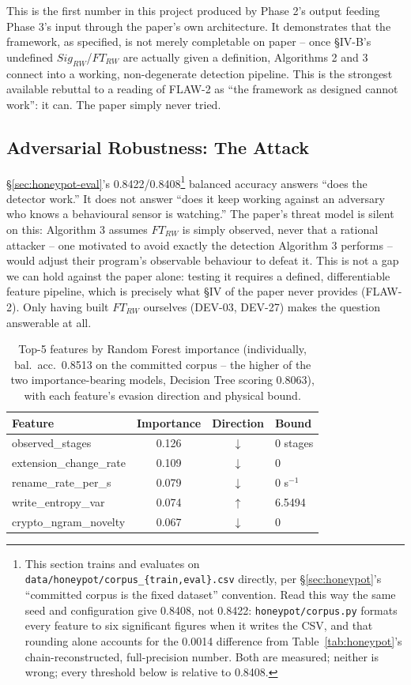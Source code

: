 \documentclass[conference]{IEEEtran}
\begin{document}
This is the first number in this project produced by Phase 2's output feeding Phase 3's input
through the paper's own architecture. It demonstrates that the framework, as specified, is not
merely completable on paper -- once \S IV-B's undefined $Sig_{RW}$/$FT_{RW}$ are actually given a
definition, Algorithms 2 and 3 connect into a working, non-degenerate detection pipeline. This is
the strongest available rebuttal to a reading of FLAW-2 as ``the framework as designed cannot
work'': it can. The paper simply never tried.

\subsection{Adversarial Robustness: The Attack}
\label{sec:adversarial}

\S\ref{sec:honeypot-eval}'s 0.8422/0.8408\footnote{This section trains and evaluates on
\texttt{data/honeypot/corpus\_\{train,eval\}.csv} directly, per \S\ref{sec:honeypot}'s ``committed
corpus is the fixed dataset'' convention. Read this way the same seed and configuration give
0.8408, not 0.8422: \texttt{honeypot/corpus.py} formats every feature to six significant figures
when it writes the CSV, and that rounding alone accounts for the 0.0014 difference from
Table~\ref{tab:honeypot}'s chain-reconstructed, full-precision number. Both are measured; neither
is wrong; every threshold below is relative to 0.8408.} balanced accuracy answers ``does the
detector work.'' It does not answer ``does it keep working against an adversary who knows a
behavioural sensor is watching.'' The paper's threat model is silent on this: Algorithm 3 assumes
$FT_{RW}$ is simply observed, never that a rational attacker -- one motivated to avoid exactly the
detection Algorithm 3 performs -- would adjust their program's observable behaviour to defeat it.
This is not a gap we can hold against the paper alone: testing it requires a defined, differentiable
feature pipeline, which is precisely what \S IV of the paper never provides (FLAW-2). Only having
built $FT_{RW}$ ourselves (DEV-03, DEV-27) makes the question answerable at all.

\begin{table}[t]
\centering
\caption{Top-5 features by Random Forest importance (individually, bal.\ acc.\ 0.8513 on the
committed corpus -- the higher of the two importance-bearing models, Decision Tree scoring
0.8063), with each feature's evasion direction and physical bound.}
\label{tab:top5}
\footnotesize
\begin{tabular}{lccl}
\hline
\textbf{Feature} & \textbf{Importance} & \textbf{Direction} & \textbf{Bound} \\
\hline
observed\_stages & 0.126 & $\downarrow$ & 0 stages \\
extension\_change\_rate & 0.109 & $\downarrow$ & 0 \\
rename\_rate\_per\_s & 0.079 & $\downarrow$ & 0 s$^{-1}$ \\
write\_entropy\_var & 0.074 & $\uparrow$ & 6.5494 \\
crypto\_ngram\_novelty & 0.067 & $\downarrow$ & 0 \\
\hline
\end{tabular}
\end{table}
\end{document}
